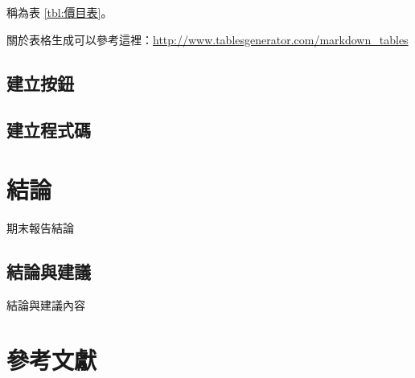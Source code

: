 \documentclass[12pt,,]{report}
\begin{document}
稱為表 \ref{tbl:價目表}。

關於表格生成可以參考這裡：\url{http://www.tablesgenerator.com/markdown_tables}

\hypertarget{ux5efaux7acbux6309ux9215}{%
\section{建立按鈕}\label{ux5efaux7acbux6309ux9215}}

\hypertarget{ux5efaux7acbux7a0bux5f0fux78bc}{%
\section{建立程式碼}\label{ux5efaux7acbux7a0bux5f0fux78bc}}

\hypertarget{ux7d50ux8ad6}{%
\chapter{結論}\label{ux7d50ux8ad6}}

期末報告結論

\hypertarget{ux7d50ux8ad6ux8207ux5efaux8b70}{%
\section{結論與建議}\label{ux7d50ux8ad6ux8207ux5efaux8b70}}

結論與建議內容

\hypertarget{ux53c3ux8003ux6587ux737b}{%
\chapter{參考文獻}\label{ux53c3ux8003ux6587ux737b}}
\end{document}
